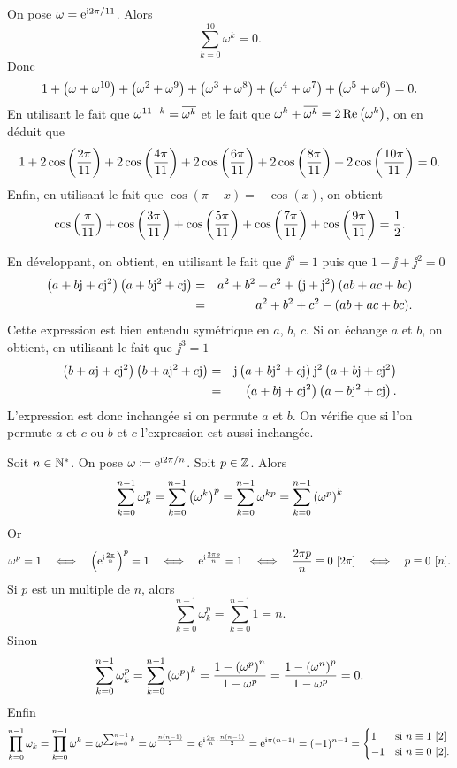 \documentclass{magnolia}
\begin{document}
\begin{sol}
\begin{questions}
\question On pose $\omega={\rm e}^{{\rm i} 2\pi/11}$. Alors
  \[\sum_{k=0}^{10} \omega^k=0.\]
  Donc
  \[1+\left(\omega+\omega^{10}\right)+\left(\omega^2+\omega^9\right)+\left(\omega^3+\omega^8\right)+\left(\omega^4+\omega^7\right)+\left(\omega^5+\omega^6\right)=0.\]
  En utilisant le fait que $\omega^{11-k}=\overline{\omega^k}$ et le fait que $\omega^k+\overline{\omega^k}=2\mathop{\rm Re}\left(\omega^k\right)$, on en déduit que
  \[1+2\cos\left(\frac{2\pi}{11}\right)+2\cos\left(\frac{4\pi}{11}\right)+2\cos\left(\frac{6\pi}{11}\right)+2\cos\left(\frac{8\pi}{11}\right)+2\cos\left(\frac{10\pi}{11}\right)=0.\]
  Enfin, en utilisant le fait que $\cos(\pi-x)=-\cos(x)$, on obtient
  \[\cos\left(\frac{\pi}{11}\right)+\cos\left(\frac{3\pi}{11}\right)+\cos\left(\frac{5\pi}{11}\right)+
    \cos\left(\frac{7\pi}{11}\right)+\cos\left(\frac{9\pi}{11}\right)=\frac{1}{2}.\]
\question
  \begin{questions}
  \question En développant, on obtient, en utilisant le fait que $\jj^3=1$ puis que $1+\jj+\jj^2=0$
    \begin{eqnarray*}
    \left(a+b{\rm j}+c{\rm j}^2\right)\left(a+b{\rm j}^2+c{\rm j}\right)
    &=& a^2+b^2+c^2+\left({\rm j}+{\rm j}^2\right)\left(ab+ac+bc\right)\\
    &=& a^2+b^2+c^2-(ab+ac+bc).
    \end{eqnarray*}
    Cette expression est bien entendu symétrique en $a$, $b$, $c$.
  \question Si on échange $a$ et $b$, on obtient, en utilisant le fait que $\jj^3=1$
    \begin{eqnarray*}
    \left(b+a{\rm j}+c{\rm j}^2\right)\left(b+a{\rm j}^2+c{\rm j}\right)
    &=& {\rm j}\left(a+b{\rm j}^2+c{\rm j}\right){\rm j}^2\left(a+b{\rm j}+c{\rm j}^2\right)\\
    &=& \left(a+b{\rm j}+c{\rm j}^2\right)\left(a+b{\rm j}^2+c{\rm j}\right).
    \end{eqnarray*}
    L'expression est donc inchangée si on permute $a$ et $b$. On vérifie que si l'on permute $a$ et $c$ ou $b$ et $c$ l'expression est aussi inchangée.
  \end{questions}
\question Soit $n\in{\mathbb{N}^*}$. On pose $\omega\coloneqq{\rm e}^{{\rm i} 2\pi/n}$. Soit $p\in\mathbb{Z}$. Alors
\[\sum_{k=0}^{n-1} \omega_k^p= \sum_{k=0}^{n-1} \left(\omega^k\right)^p = \sum_{k=0}^{n-1} \omega^{kp} = \sum_{k=0}^{n-1} \left(\omega^p\right)^k\]
Or
\[\omega^p=1 \quad\ssi\quad \p{\e^{\ii\frac{2\pi}{n}}}^p=1 \quad\ssi\quad \e^{\ii\frac{2\pi p}{n}}=1 \quad\ssi\quad \frac{2\pi p}{n}\equiv 0\ [2\pi]\quad\ssi\quad p\equiv 0\ [n].\]
Si $p$ est un multiple de $n$, alors
\[\sum_{k=0}^{n-1} \omega_k^p= \sum_{k=0}^{n-1} 1 = n.\]
Sinon
\[\sum_{k=0}^{n-1} \omega_k^p=\sum_{k=0}^{n-1} \left(\omega^p\right)^k=\frac{1-\left(\omega^p\right)^n}{1-\omega^p}=\frac{1-\left(\omega^n\right)^p}{1-\omega^p}=0.\]
Enfin
\[
\prod_{k=0}^{n-1} \omega_k
= \prod_{k=0}^{n-1} \omega^k = \omega^{\sum_{k=0}^{n-1} k} = \omega^{\frac{n(n-1)}{2}}=
{\rm e}^{{\rm i}\frac{2\pi}{n}\cdot\frac{n(n-1)}{2}}={\rm e}^{{\rm i}\pi(n-1)}=(-1)^{n-1}=\begin{cases}
1 & \text{si $n\equiv 1\ [2]$}\\
-1 & \text{si $n\equiv 0\ [2]$.}
\end{cases}
\]
\end{questions}
\end{sol}
\end{document}
